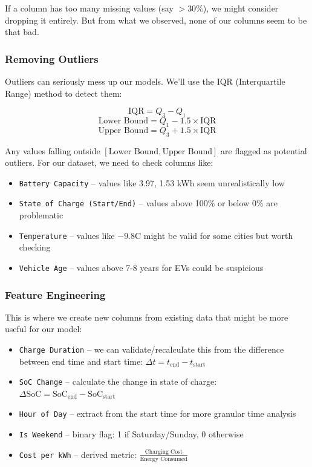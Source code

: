 \documentclass[12pt, a4paper]{article}
\begin{document}
If a column has too many missing values (say $> 30\%$), we might consider dropping it entirely. But from what we observed, none of our columns seem to be that bad.

\subsubsection{Removing Outliers}

Outliers can seriously mess up our models. We'll use the IQR (Interquartile Range) method to detect them:

$$\text{IQR} = Q_3 - Q_1$$
$$\text{Lower Bound} = Q_1 - 1.5 \times \text{IQR}$$
$$\text{Upper Bound} = Q_3 + 1.5 \times \text{IQR}$$

Any values falling outside $[\text{Lower Bound}, \text{Upper Bound}]$ are flagged as potential outliers. For our dataset, we need to check columns like:
\begin{itemize}
    \item \texttt{Battery Capacity} -- values like 3.97, 1.53 kWh seem unrealistically low
    \item \texttt{State of Charge (Start/End)} -- values above 100\% or below 0\% are problematic
    \item \texttt{Temperature} -- values like $-9.8$\textdegree C might be valid for some cities but worth checking
    \item \texttt{Vehicle Age} -- values above 7-8 years for EVs could be suspicious
\end{itemize}

\subsubsection{Feature Engineering}

This is where we create new columns from existing data that might be more useful for our model:

\begin{itemize}
    \item \texttt{Charge Duration} -- we can validate/recalculate this from the difference between end time and start time: $\Delta t = t_{\text{end}} - t_{\text{start}}$
    \item \texttt{SoC Change} -- calculate the change in state of charge: $\Delta \text{SoC} = \text{SoC}_{\text{end}} - \text{SoC}_{\text{start}}$
    \item \texttt{Hour of Day} -- extract from the start time for more granular time analysis
    \item \texttt{Is Weekend} -- binary flag: 1 if Saturday/Sunday, 0 otherwise
    \item \texttt{Cost per kWh} -- derived metric: $\frac{\text{Charging Cost}}{\text{Energy Consumed}}$
\end{itemize}
\end{document}
